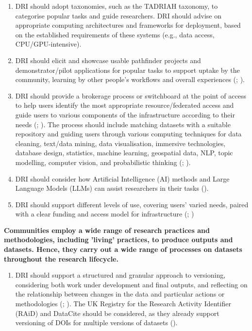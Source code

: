 \documentclass[11pt]{scrartcl}
\begin{document}
\begin{enumerate}[resume]
\item DRI should adopt taxonomies, such as the TADRIAH taxonomy, to categorise popular tasks and guide researchers. DRI should advise on appropriate computing architectures and frameworks for deployment, based on the established requirements of these systems (e.g., data access, CPU/GPU-intensive).   

\item DRI should elicit and showcase usable pathfinder projects and demonstrator/pilot applications for popular tasks to support uptake by the community, learning by other people's workflows and overall experiences (\cite[3,9]{bell_2025_17099176}; \cite[5]{evans23}).

\item DRI should provide a brokerage process or switchboard at the point of access to help users identify the most appropriate resource/federated access and guide users to various components of the infrastructure according to their needs 
(\cite[5]{bell_2025_17099176}; \cite{connected}).  
The process should include matching datasets with a suitable repository and guiding users through various computing techniques for data cleaning, text/data mining, data visualisation, immersive technologies, database design, statistics, machine learning, geospatial data, NLP, topic modelling, computer vision, and probabilistic thinking 
(\cite{connected}; \cite[38]{shoaib_sufi_2023_7686348}).   

\item DRI should consider how Artificial Intelligence (AI) methods and Large Language Models (LLMs) can assist researchers in their tasks 
(\cite[2]{bell_2025_17099176}).


\item DRI should support different levels of use, covering users' varied needs, paired with a clear funding and access model for infrastructure 
(\cite{Rodriguez22}; \cite[13]{Black19102024})
\end{enumerate}

\noindent\textbf{Communities employ a wide range of research practices and methodologies, including 'living' practices, to produce outputs and datasets. Hence, they carry out a wide range of processes on datasets throughout the research lifecycle. }

\begin{enumerate}[resume]
\item\label{itm:ver} DRI should support a structured and granular approach to versioning, considering both work under development and final outputs, and reflecting on the relationship between changes in the data and particular actions or methodologies 
(\cite[53]{de_roure_2022_4716148}; \cite[4]{wrro203045}). 
The UK Registry for the Research Activity Identifier (RAiD) and DataCite should be considered, as they already support versioning of DOIs for multiple versions of datasets (\cite[5]{evans23}).  
\end{enumerate}
\end{document}
